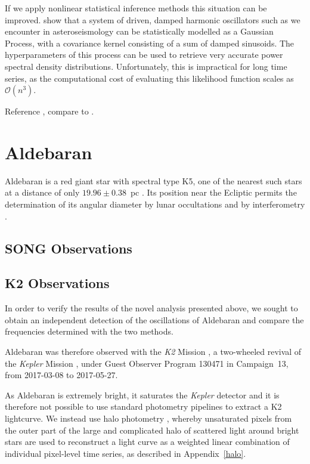 \documentclass[modern]{aastex61}
\newcommand{\kepler}{\emph{Kepler}\xspace}
\newcommand{\ktwo}{\emph{K2}\xspace}
\begin{document}
If we apply nonlinear statistical inference methods this situation can be improved. \citet{brewer2009} show that a system of driven, damped harmonic oscillators such as we encounter in asteroseismology can be statistically modelled as a Gaussian Process, with a covariance kernel consisting of a sum of damped sinusoids. The hyperparameters of this process can be used to retrieve very accurate power spectral density distributions. Unfortunately, this is impractical for long time series, as the computational cost of evaluating this likelihood function scales as $\mathcal{O}(n^3)$. 

Reference \citet{Kelly2014}, compare to \citet{Foreman-Mackey2017}.

\section{Aldebaran}
Aldebaran is a red giant star with spectral type K5, one of the nearest such stars at a distance of only $19.96 \pm 0.38$~pc \citep{hipparcos}. Its position near the Ecliptic permits the determination of its angular diameter by lunar occultations and by interferometry \citep[$20.58 \pm 0.03$ mas;][]{richichi2005,1979ApJ...228L.111B,brown1979,panek1980}.

\subsection{SONG Observations}

\subsection{K2 Observations}

In order to verify the results of the novel analysis presented above, we sought to obtain an independent detection of the oscillations of Aldebaran and compare the frequencies determined with the two methods. 

Aldebaran was therefore observed with the \ktwo Mission \citep{howell14}, a two-wheeled revival of the \kepler Mission \citep{2010sci...327..977b}, under Guest Observer Program 130471 in Campaign~13, from 2017-03-08 to 2017-05-27. 

As Aldebaran is extremely bright, it saturates the \kepler detector and it is therefore not possible to use standard photometry pipelines to extract a K2 lightcurve. We instead use halo photometry \citep[as originally implemented in][]{White2017}, whereby unsaturated pixels from the outer part of the large and complicated halo of scattered light around bright stars are used to reconstruct a light curve as a weighted linear combination of individual pixel-level time series, as described in Appendix~\ref{halo}. 
\end{document}
